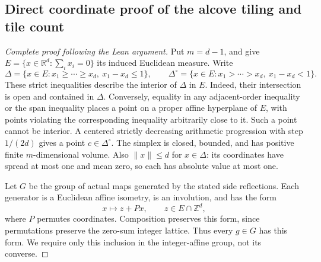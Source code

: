 
\subsection{Direct coordinate proof of the alcove tiling and tile count}
\label{leanproof:ANT-3-4}
\begin{proof}[Complete proof following the Lean argument]
Put \(m=d-1\), and give \(E=\{x\in\mathbb R^d:\sum_i x_i=0\}\)
its induced Euclidean measure. Write
\[
 \Delta=\{x\in E:x_1\ge\cdots\ge x_d,\ x_1-x_d\le1\},
 \qquad
 \Delta^\circ=\{x\in E:x_1>\cdots>x_d,\ x_1-x_d<1\}.
\]
These strict inequalities describe the interior of \(\Delta\) in \(E\).
Indeed, their intersection is open and contained in \(\Delta\).
Conversely, equality in any adjacent-order inequality or the span inequality
places a point on a proper affine hyperplane of \(E\), with points violating
the corresponding inequality arbitrarily close to it. Such a point cannot
be interior. A centered strictly decreasing arithmetic progression with step
\(1/(2d)\) gives a point \(c\in\Delta^\circ\). The simplex is closed,
bounded, and has positive finite \(m\)-dimensional volume.
Also \(\|x\|\le d\) for \(x\in\Delta\): its coordinates have spread at most
one and mean zero, so each has absolute value at most one.

Let \(G\) be the group of actual maps generated by the stated side reflections.
Each generator is a Euclidean affine isometry, is an involution, and has
the form
\[
             x\longmapsto z+P x,
 \qquad z\in E\cap\mathbb Z^d,
\]
where \(P\) permutes coordinates. Composition preserves this form, since
permutations preserve the zero-sum integer lattice. Thus every \(g\in G\)
has this form. We require only this inclusion in the integer-affine group,
not its converse.


\end{proof}
